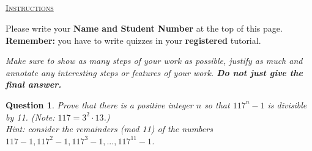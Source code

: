 \documentclass[twoside]{article}
\theoremstyle{mystyle}
\newtheorem{quest}{Question}
\begin{document}
\begin{center}
\section*{}
\vspace{0.1in}
\large \underline{\textsc{Instructions}}
\vspace{0.1in}
\normalsize

Please write your \textbf{Name and Student Number} at the top of this page.\\

\textbf{Remember:} you have to write quizzes in your \textbf{registered} tutorial.
\vspace{0.1in}
\end{center}


\begin{center}
\textit{Make sure to show as many steps of your work as possible, justify as much and annotate any interesting steps or features of your work.  \textbf{Do not just give the final answer.}} \\
\end{center}

\begin{quest} \mbox{}
Prove that there is a positive integer $n$ so that $117^n - 1$ is divisible by 11. (Note: $117 = 3^2\cdot 13$.)\\

\textit{Hint: consider the remainders (mod 11) of the numbers $117-1, 117^2-1, 117^3-1,...,117^{11}-1$.}
\end{quest}
\vspace{20pt}
\end{document}
